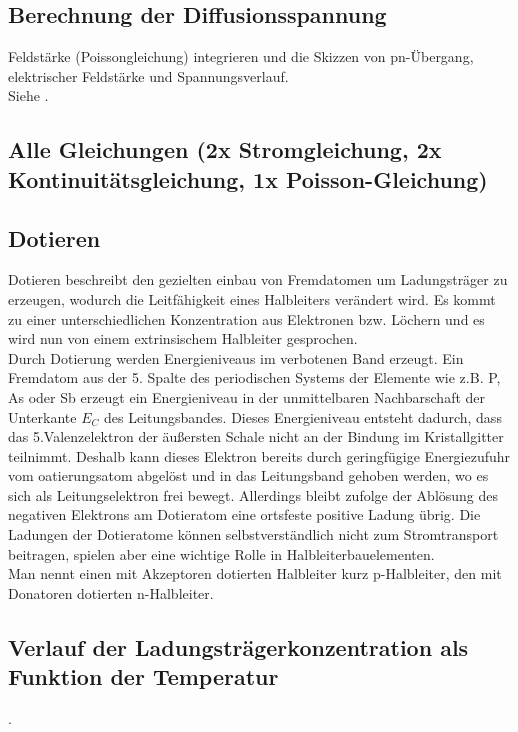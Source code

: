 
\subsection{Berechnung der Diffusionsspannung }\label{k3:diffusion}
Feldst\"arke (Poissongleichung) integrieren und die Skizzen von pn-\"Ubergang, elektrischer
Feldst\"arke und Spannungsverlauf.\\
Siehe .

\subsection{Alle Gleichungen (2x Stromgleichung, 2x Kontinuitätsgleichung, 1x Poisson-Gleichung) }\label{k3:alleGleichungen}

\subsection{Dotieren }\label{k3:dotieren}
Dotieren beschreibt den gezielten einbau von Fremdatomen um Ladungstr\"ager zu erzeugen, wodurch die Leitf\"ahigkeit eines
Halbleiters ver\"andert wird. Es kommt zu einer unterschiedlichen Konzentration aus Elektronen bzw. L\"ochern und es wird
nun von einem extrinsischem Halbleiter gesprochen.\\
Durch Dotierung werden Energieniveaus im verbotenen Band erzeugt. Ein Fremdatom aus der 5. Spalte des periodischen Systems
der Elemente wie z.B. P, As oder Sb erzeugt ein Energieniveau in der unmittelbaren Nachbarschaft der Unterkante $E_C$ des
Leitungsbandes. Dieses Energieniveau entsteht dadurch, dass das 5.Valenzelektron der äußersten Schale nicht an der
Bindung im Kristallgitter teilnimmt. Deshalb kann dieses Elektron bereits durch geringfügige Energiezufuhr vom oatierungsatom
abgelöst und in das Leitungsband gehoben werden, wo es sich als Leitungselektron frei bewegt.
Allerdings bleibt zufolge der Ablösung des negativen Elektrons am Dotieratom eine ortsfeste positive Ladung übrig. Die
Ladungen der Dotieratome können selbstverständlich nicht zum Stromtransport beitragen, spielen aber eine wichtige Rolle in
Halbleiterbauelementen.\\
Man nennt einen mit Akzeptoren dotierten Halbleiter kurz p-Halbleiter, den mit Donatoren dotierten n-Halbleiter.

\subsection{Verlauf der Ladungstr\"agerkonzentration als Funktion der Temperatur }\label{k3:ladungstraegerkonz}
.

